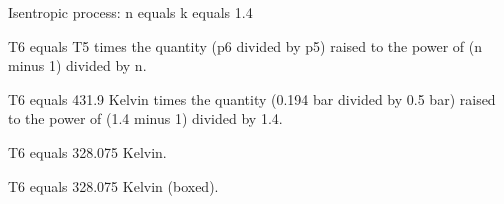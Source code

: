 Isentropic process: n equals k equals 1.4

T6 equals T5 times the quantity (p6 divided by p5) raised to the power of (n minus 1) divided by n.

T6 equals 431.9 Kelvin times the quantity (0.194 bar divided by 0.5 bar) raised to the power of (1.4 minus 1) divided by 1.4.

T6 equals 328.075 Kelvin.

T6 equals 328.075 Kelvin (boxed).